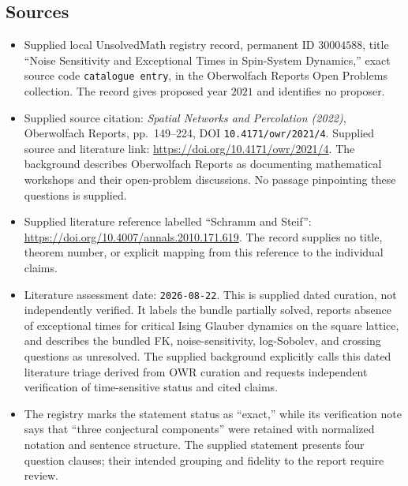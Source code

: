 \documentclass[11pt]{article}
\begin{document}
\subsection{Sources}
\begin{itemize}
\item Supplied local UnsolvedMath registry record, permanent ID \(30004588\), title ``Noise Sensitivity and Exceptional Times in Spin-System Dynamics,'' exact source code \texttt{catalogue entry}, in the Oberwolfach Reports Open Problems collection. The record gives proposed year \(2021\) and identifies no proposer.
\item Supplied source citation: \emph{Spatial Networks and Percolation (2022)}, Oberwolfach Reports, pp.\ 149--224, DOI \texttt{10.4171/owr/2021/4}. Supplied source and literature link: \url{https://doi.org/10.4171/owr/2021/4}. The background describes Oberwolfach Reports as documenting mathematical workshops and their open-problem discussions. No passage pinpointing these questions is supplied.
\item Supplied literature reference labelled ``Schramm and Steif'': \url{https://doi.org/10.4007/annals.2010.171.619}. The record supplies no title, theorem number, or explicit mapping from this reference to the individual claims.
\item Literature assessment date: \texttt{2026-08-22}. This is supplied dated curation, not independently verified. It labels the bundle partially solved, reports absence of exceptional times for critical Ising Glauber dynamics on the square lattice, and describes the bundled FK, noise-sensitivity, log-Sobolev, and crossing questions as unresolved. The supplied background explicitly calls this dated literature triage derived from OWR curation and requests independent verification of time-sensitive status and cited claims.
\item The registry marks the statement status as ``exact,'' while its verification note says that ``three conjectural components'' were retained with normalized notation and sentence structure. The supplied statement presents four question clauses; their intended grouping and fidelity to the report require review.
\end{itemize}
\end{document}
